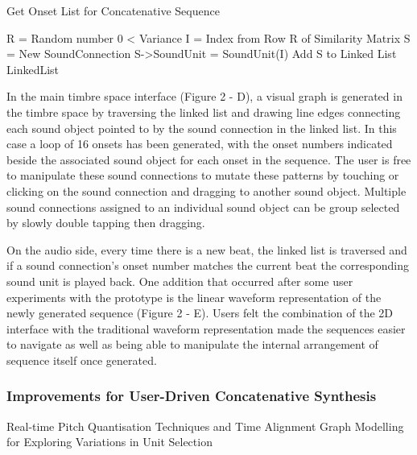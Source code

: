 \begin{algorithm}
	\caption{Get Onset List for Concatenative Sequence}
	\label{alg:sequential_scan_lower_bound}
	\begin{algorithmic}
			\State R = Random number 0 < Variance
			\State I = Index from Row R of Similarity Matrix
			\State S = New SoundConnection
			\State S->SoundUnit = SoundUnit(I)
			\State Add S to Linked List
		\EndFor
		\\
	\Return	LinkedList	
	\end{algorithmic}
\end{algorithm}
 
In the main timbre space interface (Figure 2 - D), a visual graph is generated in the timbre space by traversing the linked list and drawing line edges connecting each sound object pointed to by the sound connection in the linked list. In this case a loop of 16 onsets has been generated, with the onset numbers indicated beside the associated sound object for each onset in the sequence. The user is free to manipulate these sound connections to mutate these patterns by touching or clicking on the sound connection and dragging to another sound object. Multiple sound connections assigned to an individual sound object can be group selected by slowly double tapping then dragging.

On the audio side, every time there is a new beat, the linked list is traversed and if a sound connection’s onset number matches the current beat the corresponding sound unit is played back. One addition that occurred after some user experiments with the prototype is the linear waveform representation of the newly generated sequence (Figure 2 - E). Users felt the combination of the 2D interface with the traditional waveform representation made the sequences easier to navigate as well as being able to manipulate the internal arrangement of sequence itself once generated.

\subsubsection{Improvements for User-Driven Concatenative Synthesis}

Real-time Pitch Quantisation Techniques and Time Alignment
Graph Modelling for Exploring Variations in Unit Selection